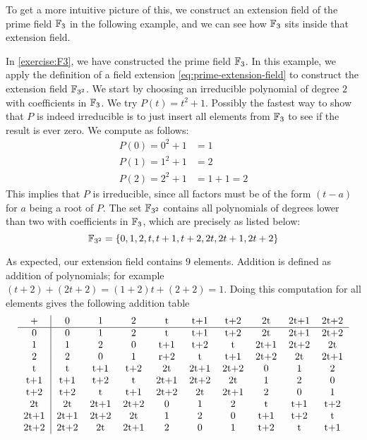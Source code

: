 To get a more intuitive picture of this, we construct an extension field of the prime field  $\mathbb{F}_3$ in the following example, and we can see how $\mathbb{F}_3$ sits inside that extension field.
\begin{example}
\label{finite_field_F3_2}
In \exercisename{} \ref{exercise:F3}, we have constructed the prime field $\mathbb{F}_3$. In this example, we apply the definition of a field extension \eqref{eq:prime-extension-field} to construct the extension field $\mathbb{F}_{3^2}$. We start by choosing an irreducible polynomial of degree $2$ with coefficients in $\mathbb{F}_3$. We try
$P(t)=t^2+1$. Possibly the fastest way to show that $P$ is indeed irreducible is to just insert all elements from $\mathbb{F}_3$ to see if the result is ever zero. We compute as follows:
\begin{align*}
P(0) = 0^2+1 &= 1\\
P(1) = 1^2+1 &= 2\\
P(2) = 2^2+1 &=  1+1  = 2
\end{align*}
This implies that $P$ is irreducible, since all factors must be of the form $(t-a)$ for $a$ being a root of $P$. The set $\mathbb{F}_{3^2}$ contains all polynomials of degrees lower than two with coefficients in $\mathbb{F}_3$, which are precisely as listed below:
\begin{equation}
\mathbb{F}_{3^2}=\{0,1,2,t,t+1,t+2,2t,2t+1,2t+2\}
\end{equation}

As expected, our extension field contains $9$ elements. Addition is  defined as addition of polynomials; for example $(t+2) + (2t+2)= (1+2)t +(2+2)= 1$. Doing this computation for all elements gives the following addition table
\begin{equation}\label{F32-add-table}
  \begin{tabular}{c | c c c c c c c c c}
    + & 0    & 1    & 2    & t    & t+1  & t+2  & 2t   & 2t+1 & 2t+2 \\\hline
    0 & 0    & 1    & 2    & t    & t+1  & t+2  & 2t   & 2t+1 & 2t+2 \\
    1 & 1    & 2    & 0    & t+1  & t+2  & t    & 2t+1 & 2t+2 & 2t   \\
    2 & 2    & 0    & 1    & r+2  & t    & t+1  & 2t+2 & 2t   & 2t+1 \\
    t & t    & t+1  & t+2  & 2t   & 2t+1 & 2t+2 & 0    & 1    & 2    \\
  t+1 & t+1  & t+2  & t    & 2t+1 & 2t+2 & 2t   & 1    & 2    & 0    \\
  t+2 & t+2  & t    & t+1  & 2t+2 & 2t   & 2t+1 & 2    & 0    & 1    \\
   2t & 2t   & 2t+1 & 2t+2 & 0    & 1    & 2    & t    & t+1  & t+2  \\
 2t+1 & 2t+1 & 2t+2 & 2t   & 1    & 2    & 0    & t+1  & t+2  & t    \\
 2t+2 & 2t+2 & 2t   & 2t+1 & 2    & 0    & 1    & t+2  & t    & t+1
  \end{tabular}
\end{equation}


\end{example}
